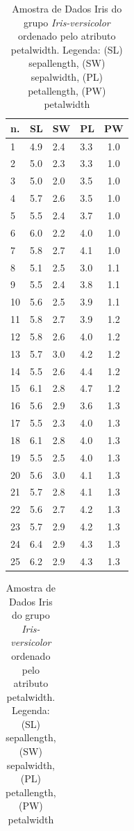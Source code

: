 \begin{table}[!ht]
\centering
\caption{Amostra de Dados Iris do grupo \textit{Iris-versicolor} ordenado pelo atributo petalwidth. Legenda: (SL) sepallength, (SW) sepalwidth, (PL) petallength, (PW) petalwidth}
\label{tab:analise:iris:cluster2:pw}
\begin{tabular}{|l|l|l|l|c|}
\hline 
 n. & SL & SW & PL & PW \\ \hline
1 & 4.9 & 2.4 & 3.3 & 1.0 \\ \hline
2 & 5.0 & 2.3 & 3.3 & 1.0 \\ \hline
3 & 5.0 & 2.0 & 3.5 & 1.0 \\ \hline
4 & 5.7 & 2.6 & 3.5 & 1.0 \\ \hline
5 & 5.5 & 2.4 & 3.7 & 1.0 \\ \hline
6 & 6.0 & 2.2 & 4.0 & 1.0 \\ \hline
7 & 5.8 & 2.7 & 4.1 & 1.0 \\ \hline
 \rowcolor[HTML]{EFEFEF} 
8 & 5.1 & 2.5 & 3.0 & 1.1 \\ \hline
 \rowcolor[HTML]{EFEFEF}  
9 & 5.5 & 2.4 & 3.8 & 1.1 \\ \hline
  \rowcolor[HTML]{EFEFEF} 
10 & 5.6 & 2.5 & 3.9 & 1.1 \\ \hline
 
\rowcolor[HTML]{EFEFEF} 
11 & 5.8 & 2.7 & 3.9 & 1.2 \\ \hline
 \rowcolor[HTML]{EFEFEF} 
12 & 5.8 & 2.6 & 4.0 & 1.2 \\ \hline
 \rowcolor[HTML]{EFEFEF} 
13 & 5.7 & 3.0 & 4.2 & 1.2 \\ \hline
 \rowcolor[HTML]{EFEFEF} 
14 & 5.5 & 2.6 & 4.4 & 1.2 \\ \hline
 \rowcolor[HTML]{EFEFEF} 
15 & 6.1 & 2.8 & 4.7 & 1.2 \\ \hline
 \rowcolor[HTML]{EFEFEF} 
16 & 5.6 & 2.9 & 3.6 & 1.3 \\ \hline
 \rowcolor[HTML]{EFEFEF} 
17 & 5.5 & 2.3 & 4.0 & 1.3 \\ \hline
 \rowcolor[HTML]{EFEFEF} 
18 & 6.1 & 2.8 & 4.0 & 1.3 \\ \hline
 \rowcolor[HTML]{EFEFEF} 
19 & 5.5 & 2.5 & 4.0 & 1.3 \\ \hline
 \rowcolor[HTML]{EFEFEF} 
20 & 5.6 & 3.0 & 4.1 & 1.3 \\ \hline
 \rowcolor[HTML]{EFEFEF} 
21 & 5.7 & 2.8 & 4.1 & 1.3 \\ \hline
 \rowcolor[HTML]{EFEFEF} 
22 & 5.6 & 2.7 & 4.2 & 1.3 \\ \hline
 \rowcolor[HTML]{EFEFEF} 
23 & 5.7 & 2.9 & 4.2 & 1.3 \\ \hline
 \rowcolor[HTML]{EFEFEF} 
24 & 6.4 & 2.9 & 4.3 & 1.3 \\ \hline
 \rowcolor[HTML]{EFEFEF} 
25 & 6.2 & 2.9 & 4.3 & 1.3 \\ \hline
  \end{tabular}
  \begin{tabular}{ |l|l|l|l|c| }
   

\end{tabular}
\end{table}
